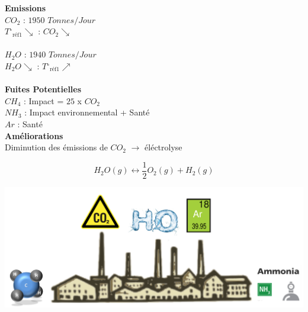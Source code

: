 \documentclass[landscape,a0paper,fontscale=0.285]{baposter} %
\begin{document}
\begin{poster}
{\begin{multicols}{2}
\textbf{Emissions}\\

$CO_{2}$ : $1950$  $Tonnes/Jour$ \\

$T\ensuremath{^\circ} _{\text{réf1}} \searrow$   :   $CO_{2}\searrow$\\
\\
$H_{2}O$   :   $1940$ $Tonnes/Jour$\\

$H_{2}O\searrow$   :   $T\ensuremath{^\circ} _{\text{réf1}} \nearrow$\\
\\
\textbf{Fuites Potentielles}\\
$CH_{4}$ :
Impact =  $25$ x $CO_{2}$\\

$NH_{3}$ : Impact environnemental + Santé   \\

$Ar$ : Santé \\


\textbf{Améliorations}\\

Diminution des émissions de $CO_{2}$ $\rightarrow $ éléctrolyse 

\[ H_{2}O(g) \leftrightarrow \frac{1}{2}  O_{2}(g) + H_{2}(g) \]


\end{multicols}
\begin{center}
\includegraphics[width=0.6\linewidth]{usine}
\end{center}

}


\end{poster}
\end{document}
